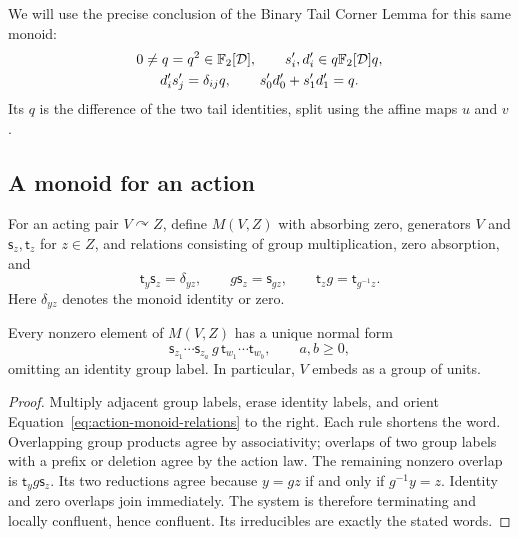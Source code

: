 We will use the precise conclusion of the Binary Tail Corner Lemma
\citep[Lemma~6.4]{FoundationsCompanion} for this same monoid:
\begin{equation}\label{eq:external-binary-corner}
 \begin{gathered}
 0\ne q=q^2\in\mathbb F_2[\mathcal D],\qquad
 s'_i,d'_i\in q\mathbb F_2[\mathcal D]q,\\
 d'_is'_j=\delta_{ij}q,\qquad
 s'_0d'_0+s'_1d'_1=q.
 \end{gathered}
\end{equation}
Its $q$ is the difference of the two tail identities, split
using the affine maps $u$ and $v$.

\subsection{A monoid for an action}

For an acting pair $V\curvearrowright Z$, define $M(V,Z)$ with
absorbing zero, generators $V$ and $\mathsf s_z,\mathsf t_z$
for $z\in Z$, and relations consisting of group multiplication,
zero absorption, and
\begin{equation}\label{eq:action-monoid-relations}
 \mathsf t_y\mathsf s_z=\delta_{yz},\qquad
 g\mathsf s_z=\mathsf s_{gz},\qquad
 \mathsf t_zg=\mathsf t_{g^{-1}z}.
\end{equation}
Here $\delta_{yz}$ denotes the monoid identity or zero.

\begin{lemma}\label{lem:action-monoid-normal-form}
Every nonzero element of $M(V,Z)$ has a unique normal form
\[
 \mathsf s_{z_1}\cdots\mathsf s_{z_a}\,g\,
 \mathsf t_{w_1}\cdots\mathsf t_{w_b},
 \qquad a,b\geq0,
\]
omitting an identity group label.  In particular, $V$ embeds
as a group of units.
\end{lemma}

\begin{proof}
Multiply adjacent group labels, erase identity labels, and
orient Equation~\eqref{eq:action-monoid-relations} to the right.
Each rule shortens the word.  Overlapping group products agree
by associativity; overlaps of two group labels with a prefix
or deletion agree by the action law.  The remaining nonzero
overlap is $\mathsf t_y g\mathsf s_z$.  Its two reductions
agree because $y=gz$ if and only if $g^{-1}y=z$.
Identity and zero overlaps join immediately.  The system is
therefore terminating and locally confluent, hence confluent.
Its irreducibles are exactly the stated words.
\end{proof}

